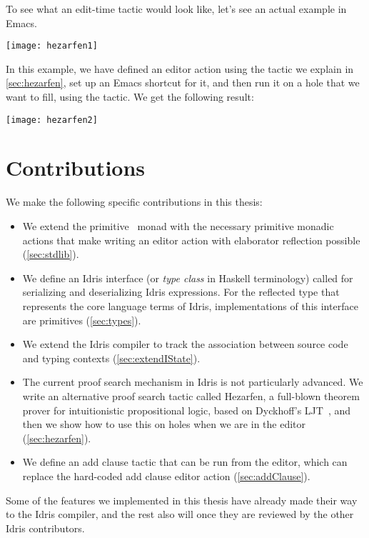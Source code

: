 To see what an edit-time tactic would look like, let's see an actual example in Emacs.

\vspace{1em}
\texttt{[image: hezarfen1]}

In this example, we have defined an editor action  using the tactic
we explain in \autoref{sec:hezarfen}, set up an Emacs shortcut for it, and then
run it on a hole that we want to fill, using the tactic. We get the following
result:

\vspace{1em}
\texttt{[image: hezarfen2]}

\section{Contributions}

We make the following specific
contributions in this thesis:
\begin{itemize}
\item We extend the primitive \Elab\ monad with the necessary primitive monadic
actions that make writing an editor action with elaborator reflection possible
(\autoref{sec:stdlib}).
\item We define an Idris interface (or \emph{type class} in Haskell terminology)
called  for serializing and deserializing Idris expressions.
For the reflected type that represents the core language terms of Idris,
implementations of this interface are primitives (\autoref{sec:types}).
\item We extend the Idris compiler to track the association between source code
  and typing contexts (\autoref{sec:extendIState}).
\item The current proof search mechanism in Idris is not particularly advanced.
We write an alternative proof search tactic called Hezarfen, a full-blown
theorem prover for intuitionistic propositional logic, based on Dyckhoff's
LJT~\cite{ljt}, and then we show how to use this on holes when we are in
the editor (\autoref{sec:hezarfen}).
\item We define an add clause tactic that can be run from the editor, which can
replace the hard-coded add clause editor action (\autoref{sec:addClause}).
\end{itemize}

Some of the features we implemented in this thesis have already made their way to
the Idris compiler, and the rest also will once they are reviewed by the
other Idris contributors.


